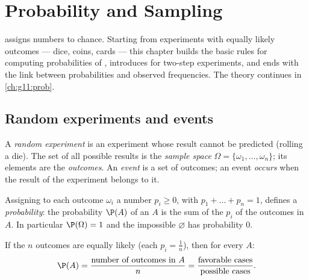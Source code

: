 \chapter{Probability and Sampling}\label{ch:g10:proba}

 assigns numbers to chance. Starting from experiments with
equally likely outcomes --- dice, coins, cards --- this chapter builds the
basic rules for computing probabilities of , introduces  for two-step experiments, and ends with the link between
probabilities and observed frequencies. The theory continues in
\cref{ch:g11:prob}.

\section{Random experiments and events}

\begin{definition}\label{def:g10:proba:events}
A \emph{random experiment} is an experiment whose
result cannot be predicted (rolling a die). The set of all possible
results is the \emph{sample space}
$\Omega = \{\omega_1, \dots, \omega_n\}$; its elements are the
\emph{outcomes}. An \emph{event} is a set of outcomes; an
event \emph{occurs} when the result of the experiment belongs to it.
\end{definition}

\begin{definition}\label{def:g10:proba:distribution}
Assigning to each outcome $\omega_i$ a number $p_i \geq 0$, with
$p_1 + \dots + p_n = 1$, defines a \emph{probability}:
the probability $\P(A)$ of an  $A$ is the sum of the $p_i$ of the
outcomes in $A$. In particular $\P(\Omega) = 1$ and the impossible 
$\varnothing$ has probability $0$.
\end{definition}

\begin{proposition}\label{prop:g10:proba:uniform}
If the $n$ outcomes are equally likely (each $p_i = \frac1n$), then for
every  $A$:
\[
\P(A) = \frac{\text{number of outcomes in } A}{n}
= \frac{\text{favorable cases}}{\text{possible cases}} .
\]
\end{proposition}

